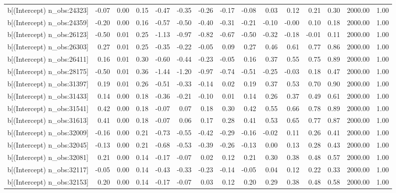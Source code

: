 \begin{table}[ht]
\begin{tabular}{rrrrrrrrrrrrrrr}
  b[(Intercept) n\_obs:24323] & -0.07 & 0.00 & 0.15 & -0.47 & -0.35 & -0.26 & -0.17 & -0.08 & 0.03 & 0.12 & 0.21 & 0.30 & 2000.00 & 1.00 \\ 
  b[(Intercept) n\_obs:24359] & -0.20 & 0.00 & 0.16 & -0.57 & -0.50 & -0.40 & -0.31 & -0.21 & -0.10 & -0.00 & 0.10 & 0.18 & 2000.00 & 1.00 \\ 
  b[(Intercept) n\_obs:26123] & -0.50 & 0.01 & 0.25 & -1.13 & -0.97 & -0.82 & -0.67 & -0.50 & -0.32 & -0.18 & -0.01 & 0.11 & 2000.00 & 1.00 \\ 
  b[(Intercept) n\_obs:26303] & 0.27 & 0.01 & 0.25 & -0.35 & -0.22 & -0.05 & 0.09 & 0.27 & 0.46 & 0.61 & 0.77 & 0.86 & 2000.00 & 1.00 \\ 
  b[(Intercept) n\_obs:26411] & 0.16 & 0.01 & 0.30 & -0.60 & -0.44 & -0.23 & -0.05 & 0.16 & 0.37 & 0.55 & 0.75 & 0.89 & 2000.00 & 1.00 \\ 
  b[(Intercept) n\_obs:28175] & -0.50 & 0.01 & 0.36 & -1.44 & -1.20 & -0.97 & -0.74 & -0.51 & -0.25 & -0.03 & 0.18 & 0.47 & 2000.00 & 1.00 \\ 
  b[(Intercept) n\_obs:31397] & 0.19 & 0.01 & 0.26 & -0.51 & -0.33 & -0.14 & 0.02 & 0.19 & 0.37 & 0.53 & 0.70 & 0.90 & 2000.00 & 1.00 \\ 
  b[(Intercept) n\_obs:31433] & 0.14 & 0.00 & 0.18 & -0.36 & -0.21 & -0.10 & 0.01 & 0.14 & 0.26 & 0.37 & 0.49 & 0.61 & 2000.00 & 1.00 \\ 
  b[(Intercept) n\_obs:31541] & 0.42 & 0.00 & 0.18 & -0.07 & 0.07 & 0.18 & 0.30 & 0.42 & 0.55 & 0.66 & 0.78 & 0.89 & 2000.00 & 1.00 \\ 
  b[(Intercept) n\_obs:31613] & 0.41 & 0.00 & 0.18 & -0.07 & 0.06 & 0.17 & 0.28 & 0.41 & 0.53 & 0.65 & 0.77 & 0.87 & 2000.00 & 1.00 \\ 
  b[(Intercept) n\_obs:32009] & -0.16 & 0.00 & 0.21 & -0.73 & -0.55 & -0.42 & -0.29 & -0.16 & -0.02 & 0.11 & 0.26 & 0.41 & 2000.00 & 1.00 \\ 
  b[(Intercept) n\_obs:32045] & -0.13 & 0.00 & 0.21 & -0.68 & -0.53 & -0.39 & -0.26 & -0.13 & 0.00 & 0.13 & 0.28 & 0.43 & 2000.00 & 1.00 \\ 
  b[(Intercept) n\_obs:32081] & 0.21 & 0.00 & 0.14 & -0.17 & -0.07 & 0.02 & 0.12 & 0.21 & 0.30 & 0.38 & 0.48 & 0.57 & 2000.00 & 1.00 \\ 
  b[(Intercept) n\_obs:32117] & -0.05 & 0.00 & 0.14 & -0.43 & -0.33 & -0.23 & -0.14 & -0.05 & 0.04 & 0.12 & 0.22 & 0.33 & 2000.00 & 1.00 \\ 
  b[(Intercept) n\_obs:32153] & 0.20 & 0.00 & 0.14 & -0.17 & -0.07 & 0.03 & 0.12 & 0.20 & 0.29 & 0.38 & 0.48 & 0.58 & 2000.00 & 1.00 \\ 

\end{tabular}
\end{table}
